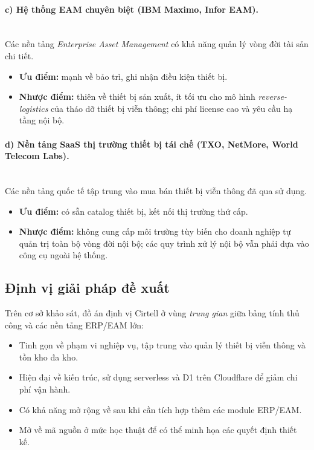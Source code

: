 \paragraph{c) Hệ thống EAM chuyên biệt (IBM Maximo, Infor EAM).}\mbox{}\\
Các nền tảng \emph{Enterprise Asset Management} có khả năng quản lý vòng đời tài sản chi tiết.
\begin{itemize}[leftmargin=1.2cm, nosep, label=\textbullet]
    \item \textbf{Ưu điểm:} mạnh về bảo trì, ghi nhận điều kiện thiết bị.
    \item \textbf{Nhược điểm:} thiên về thiết bị sản xuất, ít tối ưu cho mô hình \emph{reverse-logistics} của tháo dỡ thiết bị viễn thông; chi phí license cao và yêu cầu hạ tầng nội bộ.
\end{itemize}

\paragraph{d) Nền tảng SaaS thị trường thiết bị tái chế (TXO, NetMore, World Telecom Labs).}\mbox{}\\
Các nền tảng quốc tế tập trung vào mua bán thiết bị viễn thông đã qua sử dụng.
\begin{itemize}[leftmargin=1.2cm, nosep, label=\textbullet]
    \item \textbf{Ưu điểm:} có sẵn catalog thiết bị, kết nối thị trường thứ cấp.
    \item \textbf{Nhược điểm:} không cung cấp môi trường tùy biến cho doanh nghiệp tự quản trị toàn bộ vòng đời nội bộ; các quy trình xử lý nội bộ vẫn phải dựa vào công cụ ngoài hệ thống.
\end{itemize}

\subsection{Định vị giải pháp đề xuất}
Trên cơ sở khảo sát, đồ án định vị Cirtell ở vùng \emph{trung gian} giữa bảng tính thủ công và các nền tảng ERP/EAM lớn:
\begin{itemize}[leftmargin=1.2cm]
    \item Tinh gọn về phạm vi nghiệp vụ, tập trung vào quản lý thiết bị viễn thông và tồn kho đa kho.
    \item Hiện đại về kiến trúc, sử dụng serverless và D1 trên Cloudflare để giảm chi phí vận hành.
    \item Có khả năng mở rộng về sau khi cần tích hợp thêm các module ERP/EAM.
    \item Mở về mã nguồn ở mức học thuật để có thể minh họa các quyết định thiết kế.
\end{itemize}

